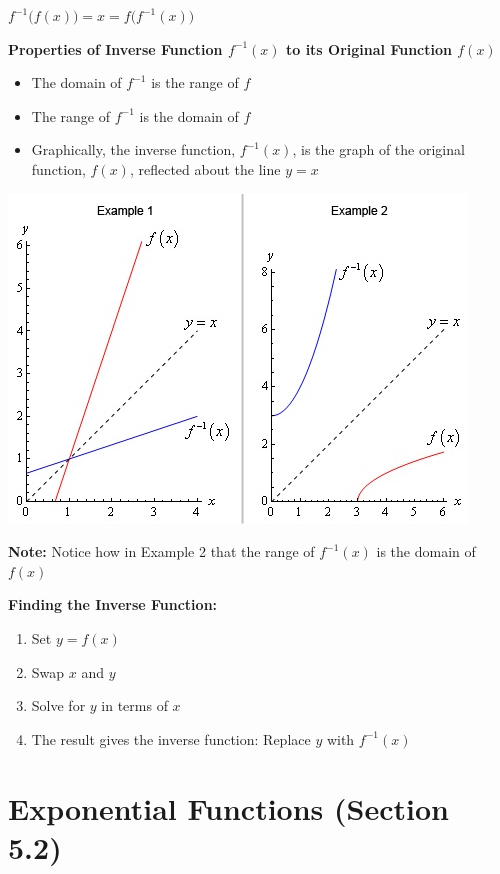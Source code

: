 \documentclass[12pt]{article}
\newenvironment{myindentpar}[1]%
     {\begin{list}{}%
             {\setlength{\leftmargin}{#1}}%
             \item[]%
     }
     {\end{list}}
\begin{document}
\centerline{$f^{-1}\Big(f(x)\Big) = x = f\Big(f^{-1}(x)\Big)$ }

\textbf{Properties of Inverse Function $f^{-1}(x)$ to its Original Function $f(x)$}
\begin{myindentpar}{1cm}

\begin{itemize}
\item The domain of $f^{-1}$ is the range of $f$
\item The range of $f^{-1}$ is the domain of $f$
\item Graphically, the inverse function, $f^{-1}(x)$, is the graph of the original function, $f(x)$,  reflected about the line $y=x$
\end{itemize}

\includegraphics{InverseGraph.jpg}

\textbf{Note:} Notice how in Example 2 that the range of $f^{-1}(x)$ is the domain of $f(x)$

\end{myindentpar}

\textbf{Finding the Inverse Function:}

\begin{enumerate}
\item Set $y = f(x)$
\item Swap $x$ and $y$
\item Solve for $y$ in terms of $x$
\item The result gives the inverse function: Replace $y$ with $f^{-1}(x)$
\end{enumerate}

\newpage

\section{Exponential Functions (Section 5.2)}
\end{document}

